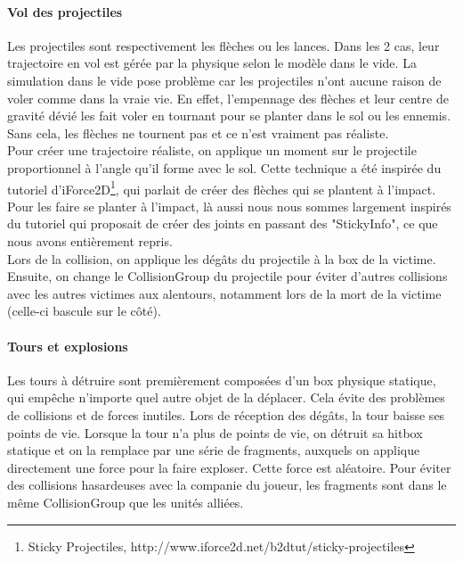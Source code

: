 \documentclass[a4paper,10pt]{article}
\begin{document}
    \paragraph{Vol des projectiles}
  Les projectiles sont respectivement les flèches ou les lances. Dans les 2 cas, leur trajectoire en vol est gérée par la physique selon le modèle dans le vide. La simulation dans le vide pose problème car les projectiles n'ont aucune raison de voler comme dans la vraie vie. En effet, l'empennage des flèches et leur centre de gravité dévié les fait voler en tournant pour se planter dans le sol ou les ennemis. Sans cela, les flèches ne tournent pas et ce n'est vraiment pas réaliste.\\
  Pour créer une trajectoire réaliste, on applique un moment sur le projectile proportionnel à l'angle qu'il forme avec le sol. Cette technique a été inspirée du tutoriel d'iForce2D\footnote{Sticky Projectiles, http://www.iforce2d.net/b2dtut/sticky-projectiles}, qui parlait de créer des flèches qui se plantent à l'impact. \\
  Pour les faire se planter à l'impact, là aussi nous nous sommes largement inspirés du tutoriel qui proposait de créer des joints en passant des "StickyInfo", ce que nous avons entièrement repris. \\ 
  Lors de la collision, on applique les dégâts du projectile à la box de la victime. Ensuite, on change le CollisionGroup du projectile pour éviter d'autres collisions avec les autres victimes aux alentours, notamment lors de la mort de la victime (celle-ci bascule sur le côté).
  
  \paragraph{Tours et explosions}
  Les tours à détruire sont premièrement composées d'un box physique statique, qui empêche n'importe quel autre objet de la déplacer. Cela évite des problèmes de collisions et de forces inutiles. Lors de réception des dégâts, la tour baisse ses points de vie. Lorsque la tour n'a plus de points de vie, on détruit sa hitbox statique et on la remplace par une série de fragments, auxquels on applique directement une force pour la faire exploser. Cette force est aléatoire. Pour éviter des collisions hasardeuses avec la companie du joueur, les fragments sont dans le même CollisionGroup que les unités alliées.
  
\end{document}
